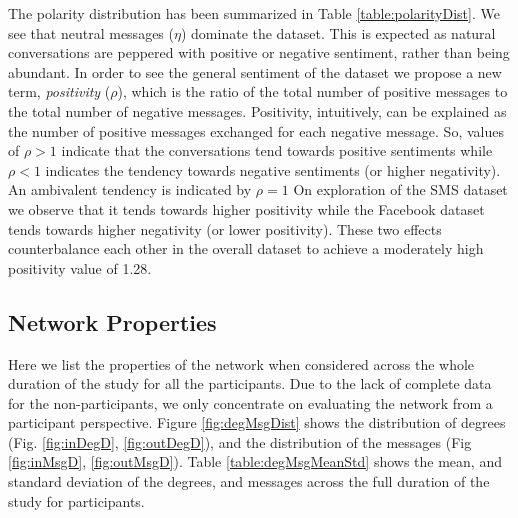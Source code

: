 \begin{figure*}
\centering
{}
\caption{Degree and Message Distribution for the SMS+FB}
\label{fig:degMsgDist}
\end{figure*}

The polarity distribution has been summarized in Table \ref{table:polarityDist}. 
We see that neutral messages ($\eta$) dominate the dataset. 
This is expected as natural conversations are peppered with positive or negative sentiment, rather than being abundant. 
In order to see the general sentiment of the dataset we propose a new term, \emph{positivity} ($\rho$), which is the ratio of the total number of positive messages to the total number of negative messages. 
Positivity, intuitively, can be explained as the number of positive messages exchanged for each negative message. 
So, values of $\rho > 1$ indicate that the conversations tend towards positive sentiments while $\rho < 1$ indicates the tendency towards negative sentiments (or higher negativity). An ambivalent tendency is indicated by $\rho = 1$
On exploration of the SMS dataset we observe that it tends towards higher positivity while the Facebook dataset tends towards higher negativity (or lower positivity). 
These two effects counterbalance each other in the overall dataset to achieve a moderately high positivity value of 1.28. 

\subsection{Network Properties}
Here we list the properties of the network when considered across the whole duration of the study for all the participants. 
Due to the lack of complete data for the non-participants, we only concentrate on evaluating the network from a participant perspective. 
Figure \ref{fig:degMsgDist} shows the distribution of degrees (Fig. \ref{fig:inDegD}, \ref{fig:outDegD}), and the distribution of the messages (Fig \ref{fig:inMsgD}, \ref{fig:outMsgD}). 
Table \ref{table:degMsgMeanStd} shows the mean, and standard deviation of the degrees, and messages across the full duration of the study for participants. 

